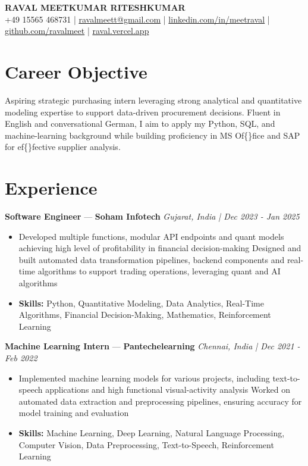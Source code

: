 \documentclass[a4paper,10pt]{article}
\begin{document}
\begin{center}
  {\Large\bfseries RAVAL MEETKUMAR RITESHKUMAR}\\[2pt]
  {\small +49 15565 468731 \;|\; \href{mailto:ravalmeett@gmail.com}{ravalmeett@gmail.com} \;|\; \href{https://www.linkedin.com/in/meetraval/}{linkedin.com/in/meetraval} \;|\; \href{https://github.com/ravalmeet}{github.com/ravalmeet} \;|\; \href{https://raval.vercel.app/}{raval.vercel.app}}
\end{center}
\vspace{-3pt}

\section*{Career Objective}
Aspiring strategic purchasing intern leveraging strong analytical and quantitative modeling expertise to support data-driven procurement decisions. Fluent in English and conversational German, I aim to apply my Python, SQL, and machine-learning background while building proficiency in MS Of\{\}fice and SAP for ef\{\}fective supplier analysis.\par

\section*{Experience}
\textbf{Software Engineer} — \textbf{Soham Infotech} \hfill \textit{Gujarat, India \;|\; Dec 2023 - Jan 2025}\par
\vspace{1pt}
\begin{itemize}
  \item Developed multiple functions, modular API endpoints and quant models achieving high level of profitability in financial decision-making Designed and built automated data transformation pipelines, backend components and real-time algorithms to support trading operations, leveraging quant and AI algorithms
  \item \textbf{Skills:} Python, Quantitative Modeling, Data Analytics, Real-Time Algorithms, Financial Decision-Making, Mathematics, Reinforcement Learning
\end{itemize}
\vspace{3pt}
\textbf{Machine Learning Intern} — \textbf{Pantechelearning} \hfill \textit{Chennai, India \;|\; Dec 2021 - Feb 2022}\par
\vspace{1pt}
\begin{itemize}
  \item Implemented machine learning models for various projects, including text-to-speech applications and high functional visual-activity analysis Worked on automated data extraction and preprocessing pipelines, ensuring accuracy for model training and evaluation
  \item \textbf{Skills:} Machine Learning, Deep Learning, Natural Language Processing, Computer Vision, Data Preprocessing, Text-to-Speech, Reinforcement Learning
\end{itemize}
\end{document}
